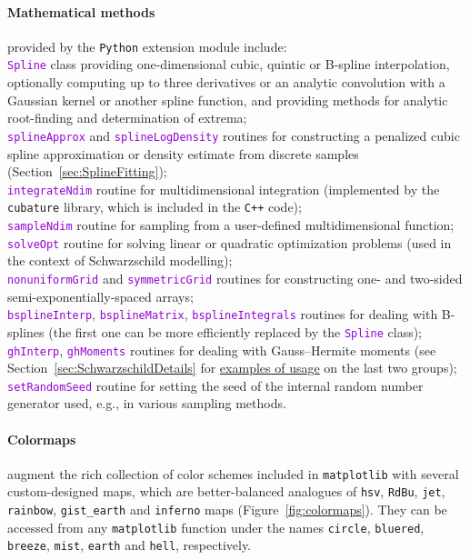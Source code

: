 \documentclass[12pt]{article}
\newcommand{\Cpp}  {\texttt{C++}\xspace}
\newcommand{\Python}{\texttt{Python}\xspace}
\newcommand{\ttt}[1]{\textcolor{darkviolet}{\texttt{#1}}}
\newcommand{\ppp}[1]{\textcolor{darkolive} {\texttt{#1}}}
\let\oldparagraph\paragraph
\renewcommand{\paragraph}[1]{\vspace{-2mm}\oldparagraph{#1}}
\begin{document}
\paragraph{Mathematical methods} provided by the \Python extension module include:\\
\ttt{Spline} class providing one-dimensional cubic, quintic or B-spline interpolation, optionally computing up to three derivatives or an analytic convolution with a Gaussian kernel or another spline function, and providing methods for analytic root-finding and determination of extrema;\\
\ttt{splineApprox} and \ttt{splineLogDensity} routines for constructing a penalized cubic spline approximation or density estimate from discrete samples (Section~\ref{sec:SplineFitting});\\
\ttt{integrateNdim} routine for multidimensional integration (implemented by the \texttt{cubature} library, which is included in the \Cpp code);\\
\ttt{sampleNdim} routine for sampling from a user-defined multidimensional function;\\
\ttt{solveOpt} routine for solving linear or quadratic optimization problems (used in the context of Schwarzschild modelling);\\
\ttt{nonuniformGrid} and \ttt{symmetricGrid} routines for constructing one- and two-sided semi-exponentially-spaced arrays;\\
\ttt{bsplineInterp}, \ttt{bsplineMatrix}, \ttt{bsplineIntegrals} routines for dealing with B-splines (the first one can be more efficiently replaced by the \ttt{Spline} class);\\
\ttt{ghInterp}, \ttt{ghMoments} routines for dealing with Gauss--Hermite moments (see Section~\ref{sec:SchwarzschildDetails} for \hyperref[sec:SchwarzschildExample]{examples of usage} on the last two groups);\\
\ttt{setRandomSeed} routine for setting the seed of the internal random number generator used, e.g., in various sampling methods.

\paragraph{Colormaps} augment the rich collection of color schemes included in \texttt{matplotlib} with several custom-designed maps, which are better-balanced analogues of \texttt{hsv}, \texttt{RdBu}, \texttt{jet}, \texttt{rainbow}, \texttt{gist_earth} and \texttt{inferno} maps (Figure~\ref{fig:colormaps}). They can be accessed from any \texttt{matplotlib} function under the names \ppp{circle}, \ppp{bluered}, \ppp{breeze}, \ppp{mist}, \ppp{earth} and \ppp{hell}, respectively.
\end{document}
